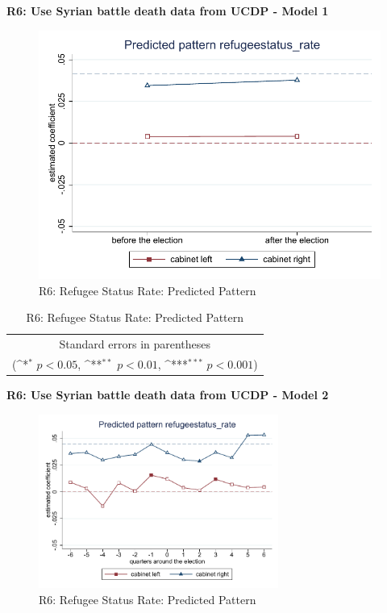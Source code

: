 \documentclass[10pt,a4paper]{scrartcl}
\begin{document}
\clearpage
\textbf{R6: Use Syrian battle death data from UCDP - Model 1}
\begin{figure}[!ht]
	\centering
	\includegraphics[width=1\textwidth]{figures_edited/refugeestatus_rate_graph1_R6.pdf}
	\caption{R6: Refugee Status Rate: Predicted Pattern}
\end{figure}

\begin{table}[!ht]\centering
	\renewcommand{\arraystretch}{1.25}
	\def\sym#1{\ifmmode^{#1}\else\(^{#1}\)\fi}
	\caption{R6: Refugee Status Rate: Predicted Pattern}
	\begin{tabular}{l*{2}{c}}
		\hline\hline
		
		\hline\hline
		\multicolumn{3}{c}{\footnotesize Standard errors in parentheses} \\
		\multicolumn{3}{c}{\footnotesize (\sym{*} \(p<0.05\), \sym{**} \(p<0.01\), \sym{***} \(p<0.001\))}\\
	\end{tabular}
\end{table}

\clearpage
\textbf{R6: Use Syrian battle death data from UCDP - Model 2}
\begin{figure}[!ht]
	\centering
	\includegraphics[width=0.7\textwidth]{figures_edited/refugeestatus_rate_graph2_R6.pdf}
	\caption{R6: Refugee Status Rate: Predicted Pattern}
\end{figure}
\end{document}
